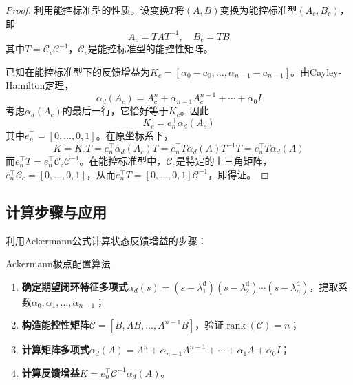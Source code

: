 \begin{proof}
利用能控标准型的性质。设变换$T$将$(A,B)$变换为能控标准型$(A_c, B_c)$，即
\[
A_c = TAT^{-1}, \quad B_c = TB
\]
其中$T = \mathcal{C}_c \mathcal{C}^{-1}$，$\mathcal{C}_c$是能控标准型的能控性矩阵。

已知在能控标准型下的反馈增益为$K_c = [\alpha_0 - a_0, \dots, \alpha_{n-1} - a_{n-1}]$。由Cayley-Hamilton定理，
\[
\alpha_d(A_c) = A_c^n + \alpha_{n-1}A_c^{n-1} + \cdots + \alpha_0 I
\]
考虑$\alpha_d(A_c)$的最后一行，它恰好等于$K_c$。因此
\[
K_c = e_n^{\top} \alpha_d(A_c)
\]
其中$e_n^{\top} = [0, \dots, 0, 1]$。在原坐标系下，
\[
K = K_c T = e_n^{\top} \alpha_d(A_c) T = e_n^{\top} T \alpha_d(A) T^{-1} T = e_n^{\top} T \alpha_d(A)
\]
而$e_n^{\top} T = e_n^{\top} \mathcal{C}_c \mathcal{C}^{-1}$。在能控标准型中，$\mathcal{C}_c$是特定的上三角矩阵，$e_n^{\top} \mathcal{C}_c = [0, \dots, 0, 1]$，从而$e_n^{\top} T = [0, \dots, 0, 1] \mathcal{C}^{-1}$，即得证。
\end{proof}

\subsection{计算步骤与应用}

利用Ackermann公式计算状态反馈增益的步骤：

\begin{myalgorithm}{Ackermann极点配置算法}
\begin{enumerate}
\item \textbf{确定期望闭环特征多项式}$\alpha_d(s) = (s - \lambda_1^{\mathrm{d}})(s - \lambda_2^{\mathrm{d}}) \cdots (s - \lambda_n^{\mathrm{d}})$，提取系数$\alpha_0, \alpha_1, \dots, \alpha_{n-1}$；
\item \textbf{构造能控性矩阵}$\mathcal{C} = [B, AB, \dots, A^{n-1}B]$，验证$\operatorname{rank}(\mathcal{C}) = n$；
\item \textbf{计算矩阵多项式}$\alpha_d(A) = A^n + \alpha_{n-1}A^{n-1} + \cdots + \alpha_1 A + \alpha_0 I$；
\item \textbf{计算反馈增益}$K = e_n^{\top} \mathcal{C}^{-1} \alpha_d(A)$。
\end{enumerate}
\end{myalgorithm}

